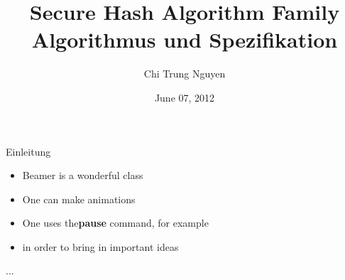\documentclass{beamer}
\title[SHA - Algorithmus und Spezifikation]{Secure Hash Algorithm Family\\Algorithmus und Spezifikation}
\author{Chi Trung Nguyen}
\institute{T-Systems}
\date{June 07, 2012}
\begin{document}
\begin{frame}
\titlepage
\end{frame}

\begin{frame}{Einleitung}
\begin{itemize}
\pause \item Beamer is a wonderful class
\pause \item One can make animations
\pause \item One uses the\textbf{pause} command, for example
\pause \item in order to bring in important ideas
\end{itemize}
\end{frame}

\begin{frame}
...
\end{frame}
\end{document}
